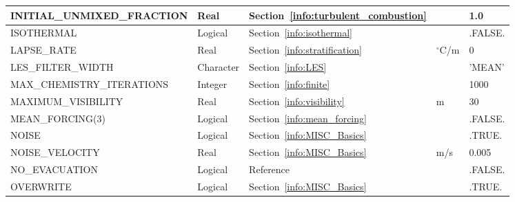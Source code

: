 \documentclass[11pt]{book}
\begin{document}
\begin{longtable}{@{\extracolsep{\fill}}|l|l|l|l|l|}
{\ct INITIAL\_UNMIXED\_FRACTION}                & Real          & Section~\ref{info:turbulent_combustion}               &               & 1.0               \\ \hline
{\ct ISOTHERMAL}                                & Logical       & Section~\ref{info:isothermal}                         &               & {\ct .FALSE.}     \\ \hline
{\ct LAPSE\_RATE}                               & Real          & Section~\ref{info:stratification}                     &  $^\circ$C/m  & 0                 \\ \hline
{\ct LES\_FILTER\_WIDTH}                        & Character     & Section~\ref{info:LES}                                &               & {\ct 'MEAN'}      \\ \hline
{\ct MAX\_CHEMISTRY\_ITERATIONS}                & Integer       & Section~\ref{info:finite}                             &               &  1000             \\ \hline
{\ct MAXIMUM\_VISIBILITY}                       & Real          & Section~\ref{info:visibility}                         &  m            &  30               \\ \hline
{\ct MEAN\_FORCING(3)}                          & Logical       & Section~\ref{info:mean_forcing}                       &               & {\ct .FALSE.}     \\ \hline
{\ct NOISE}                                     & Logical       & Section~\ref{info:MISC_Basics}                        &               & {\ct .TRUE.}      \\ \hline
{\ct NOISE\_VELOCITY}                           & Real          & Section~\ref{info:MISC_Basics}                        &  m/s          & 0.005             \\ \hline
{\ct NO\_EVACUATION}                            & Logical       & Reference~\cite{FDS_Evac_Users_Guide}                 &               & {\ct .FALSE.}     \\ \hline
{\ct OVERWRITE}                                 & Logical       & Section~\ref{info:MISC_Basics}                        &               & {\ct .TRUE.}      \\ \hline

\end{longtable}
\end{document}
